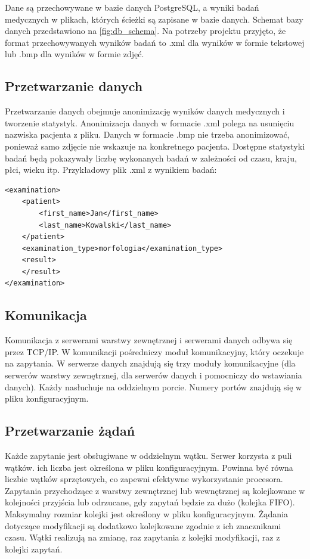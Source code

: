 Dane są przechowywane w bazie danych PostgreSQL, a wyniki badań medycznych w plikach, których ścieżki są zapisane w bazie danych. Schemat bazy danych przedstawiono na \ref{fig:db_schema}. Na potrzeby projektu przyjęto, że format przechowywanych wyników badań to .xml dla wyników w formie tekstowej lub .bmp dla wyników w formie zdjęć.


\subsection{Przetwarzanie danych}

Przetwarzanie danych obejmuje anonimizację wyników danych medycznych i tworzenie statystyk. Anonimizacja danych w formacie .xml polega na usunięciu nazwiska pacjenta z pliku. Danych w formacie .bmp nie trzeba anonimizować, ponieważ samo zdjęcie nie wskazuje na konkretnego pacjenta. Dostępne statystyki badań będą pokazywały liczbę wykonanych badań w zależności od czasu, kraju, płci, wieku itp.
Przykładowy plik .xml z wynikiem badań:
\begin{lstlisting}[style=incode]
<examination>
    <patient>
        <first_name>Jan</first_name>
        <last_name>Kowalski</last_name>
    </patient>
    <examination_type>morfologia</examination_type>
    <result>
    </result>
</examination>
\end{lstlisting}


\subsection{Komunikacja}
Komunikacja z serwerami warstwy zewnętrznej i serwerami danych odbywa się przez TCP/IP. W komunikacji pośredniczy moduł komunikacyjny, który oczekuje na zapytania. W serwerze danych znajdują się trzy moduły komunikacyjne (dla serwerów warstwy zewnętrznej, dla serwerów danych i pomocniczy do wstawiania danych). Każdy nasłuchuje na oddzielnym porcie. Numery portów znajdują się w pliku konfiguracyjnym. 

\subsection{Przetwarzanie żądań}
Każde zapytanie jest obsługiwane w oddzielnym wątku. Serwer korzysta z puli wątków. ich liczba jest określona w pliku konfiguracyjnym. Powinna być równa liczbie wątków sprzętowych, co zapewni efektywne wykorzystanie procesora. Zapytania przychodzące z warstwy zewnętrznej lub wewnętrznej są kolejkowane w kolejności przyjścia lub odrzucane, gdy zapytań będzie za dużo (kolejka FIFO). Maksymalny rozmiar kolejki jest określony w pliku konfiguracyjnym. Żądania dotyczące modyfikacji są dodatkowo kolejkowane zgodnie z ich znacznikami czasu. Wątki realizują na zmianę, raz zapytania z kolejki modyfikacji, raz z kolejki zapytań.

